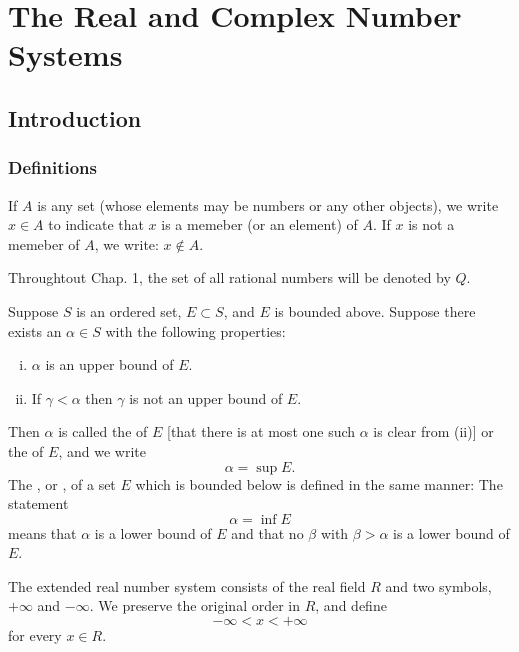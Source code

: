 \chapter{The Real and Complex Number Systems}
\section{Introduction}
\subsection{Definitions}
\begin{deff}
	If $A$ is any set (whose elements may be numbers or any other objects), we write $x \in A$ to indicate that $x$ is a memeber (or an element) of $A$. If $x$ is not a memeber of $A$, we write: $x \notin A$.
\end{deff}

\begin{deff}
	Throughtout Chap. 1, the set of all rational numbers will be denoted by $Q$.
\end{deff}

\begin{deff}\label{def:supinf}
	Suppose $S$ is an ordered set, $E\subset S$, and $E$ is bounded above. Suppose there exists an $\alpha\in S$ with the following properties:
	\begin{enumerate}[(i)]
		\item $\alpha$ is an upper bound of $E$.
		\item If $\gamma <\alpha$ then $\gamma$ is not an upper bound of $E$.
	\end{enumerate}
	Then $\alpha$ is called the {} of $E$ [that there is at most one such $\alpha$ is clear from (ii)] or the {} of $E$, and we write $$\alpha=\sup E.$$ The {}, or {}, of a set $E$ which is bounded below is defined in the same manner: The statement $$\alpha = \inf E$$ means that $\alpha$ is a lower bound of $E$ and that no $\beta$ with $\beta>\alpha$ is a lower bound of $E$.
\end{deff}

\begin{deff}\label{def:infinity}
	The extended real number system consists of the real field $R$ and two symbols, $+\infty$ and $-\infty$. We preserve the original order in $R$, and define $$-\infty<x<+\infty$$ for every $x\in R$.
\end{deff}

